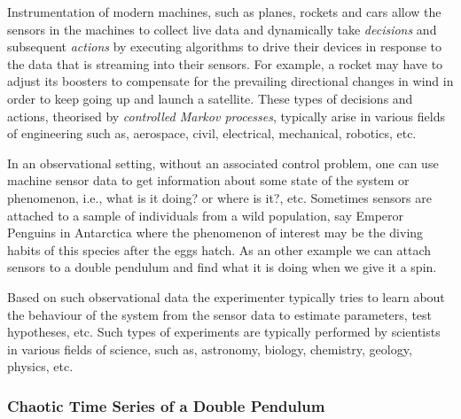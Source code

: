 Instrumentation of modern machines, such as planes, rockets and cars allow the sensors in the machines to collect live data and dynamically take {\em decisions} and subsequent {\em actions} by executing algorithms to drive their devices in response to the data that is streaming into their sensors.  For example, a rocket may have to adjust its boosters to compensate for the prevailing directional changes in wind in order to keep going up and launch a satellite.
These types of decisions and actions, theorised by {\em controlled Markov processes}, typically arise in various fields of engineering such as, aerospace, civil, electrical, mechanical, robotics, etc.

In an observational setting, without an associated control problem, one can use machine sensor data to get information about some state of the system or phenomenon, i.e., what is it doing? or where is it?, etc.  Sometimes sensors are attached to a sample of individuals from a  wild population, say Emperor Penguins in Antarctica where the phenomenon of interest may be the diving habits of this species after the eggs hatch.  As an other example we can attach sensors to a double pendulum and find what it is doing when we give it a spin.

Based on such observational data the experimenter typically tries to learn about the behaviour of the system from the sensor data to estimate parameters, test hypotheses, etc. Such types of experiments are typically performed by scientists in various fields of science, such as, astronomy, biology, chemistry, geology, physics, etc.

\subsubsection{Chaotic Time Series of a Double Pendulum}

